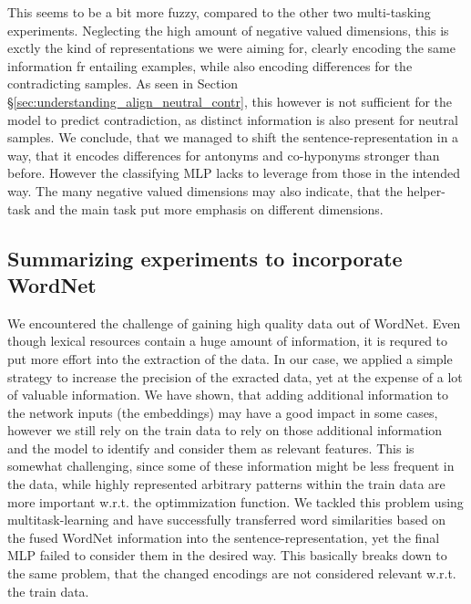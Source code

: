 This seems to be a bit more fuzzy, compared to the other two multi-tasking experiments. Neglecting the high amount of negative valued dimensions, this is exctly the kind of representations we were aiming for, clearly encoding the same information fr entailing examples, while also encoding differences for the contradicting samples. As seen in Section §\ref{sec:understanding_align_neutral_contr}, this however is not sufficient for the model to predict contradiction, as distinct information is also present for neutral samples. We conclude, that we managed to shift the sentence-representation in a way, that it encodes differences for antonyms and co-hyponyms stronger than before. However the classifying \ac{MLP} lacks to leverage from those in the intended way. The many negative valued dimensions may also indicate, that the helper-task and the main task put more emphasis on different dimensions.
\subsection{Summarizing experiments to incorporate WordNet}
We encountered the challenge of gaining high quality data out of WordNet. Even though lexical resources contain a huge amount of information, it is requred to put more effort into the extraction of the data. In our case, we applied a simple strategy to increase the precision of the exracted data, yet at the expense of a lot of valuable information. We have shown, that adding additional information to the network inputs (the embeddings) may have a good impact in some cases, however we still rely on the train data to rely on those additional information and the model to identify and consider them as relevant features. This is somewhat challenging, since some of these information might be less frequent in the data, while highly represented arbitrary patterns within the train data are more important w.r.t. the optimmization function. We tackled this problem using multitask-learning and have successfully transferred word similarities based on the fused WordNet information into the sentence-representation, yet the final \ac{MLP} failed to consider them in the desired way. This basically breaks down to the same problem, that the changed encodings are not considered relevant w.r.t. the train data.
